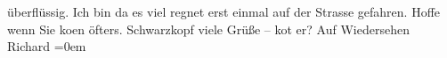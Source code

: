 \begin{ledgroupsized}[t]{13cm}
               überflüssig.\pend
           \pstart
           Ich bin da es viel regnet erst einmal auf der Strasse gefahren. Hoffe wenn Sie ko{\geminationm}en {\pb}öfters. Schwarzkopf viele Grüße – ko{\geminationm}t er?\pend
           \pstart
           Auf Wiedersehen{\\[\baselineskip]}\spacefill\mbox{Richard}\pend
           \leftskip=0em{}          \endnumbering{}\end{ledgroupsized}  \newcommand{\dateiname}{L00689}\newcommand{\titel}{Richard Beer-Hofmann an Arthur Schnitzler, 22. 6. 1897}\newcommand{\editorInnen}{Martin Anton Müller und Gerd-Hermann Susen}
            \footnotesize
\begin{ledgroupsized}[t]{11.5cm}
\end{ledgroupsized}
         
      